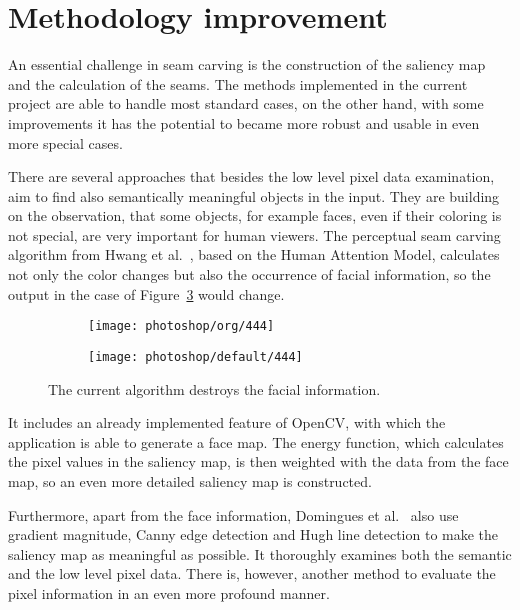 \documentclass[draft,final]{vutinfth} %
\begin{document}
	\section{Methodology improvement}
	An essential challenge in seam carving is the construction of the saliency map and the calculation of the seams. 
	The methods implemented in the current project are able to handle most standard cases, on the other hand, with some improvements it has the potential to became more robust and usable in even more special cases.\par 
	There are several approaches that besides the low level pixel data examination, aim to find also semantically meaningful objects in the input.
	They are building on the observation, that some objects, for example faces, even if their coloring is not special, are very important for human viewers.
	The perceptual seam carving algorithm from Hwang et al.~\cite{hwang2008content}, based on the Human Attention Model, calculates not only the color changes but also the occurrence of facial information, so the output in the case of Figure~\ref{fig:face} would change.
	\begin{figure}[H]
		\centering
		\begin{subfigure}[b]{0.45\columnwidth}
			\centering
			\texttt{[image: photoshop/org/444]}
			\label{fig:res:th1}
		\end{subfigure}
		\begin{subfigure}[b]{0.45\columnwidth}
			\centering
			\texttt{[image: photoshop/default/444]}
			\label{fig:res:th2}
		\end{subfigure}
		\caption{The current algorithm destroys the facial information.}
		\label{fig:face}
	\end{figure}  	
	It includes an already implemented feature of OpenCV, with which the application is able to generate a face map.
	The energy function, which calculates the pixel values in the saliency map, is then weighted with the data from the face map, so an even more detailed saliency map is constructed.\par 
	Furthermore, apart from the face information, Domingues et al.~\cite{domingues2010stream} also use gradient magnitude, Canny edge detection and Hugh line detection to make the saliency map as meaningful as possible. 
	It thoroughly examines both the semantic and the low level pixel data.
	There is, however, another method to evaluate the pixel information in an even more profound manner.
\end{document}

